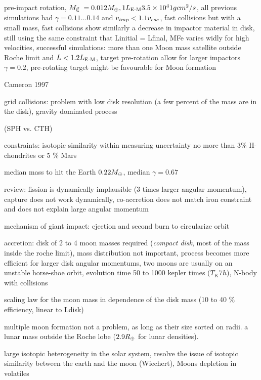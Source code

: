 \citep{Canup:2008p3551}
pre-impact rotation, $\ML = 0.012 \ME, 1 \lem 3.5 \times 10^41 g cm^2 / s$, all previous simulations had $\gamma = 0.11 \dots 0.14$ and $v_{imp} < 1.1 v_{esc}$, fast collisions but with a small mass, fast collisions show similarly a decrease in impactor material in disk, still using the same constraint that Linitial = Lfinal, MFe varies widly for high velocities, successful simulations: more than one Moon mass satellite outside Roche limit and $L < 1.2 L_{\textrm{E-M}}$, target pre-rotation allow for larger impactors $\gamma = 0.2$, pre-rotating target might be favourable for Moon formation

\cite{1997Icar..126..126C} Cameron 1997

grid collisions:
\cite{Wada:2006p1013}
problem with low disk resolution (a few percent of the mass are in the disk), gravity dominated process

\citep{Canup:2010p3713} (SPH vs. CTH)

constraints:
\cite{Wiechert:2001p3543}
isotopic similarity within measuring uncertainty
no more than 3\% H-chondrites or 5 \% Mars

\cite{Chambers:2001p2105}
median mass to hit the Earth $0.22 M_{\oplus}$, median $\gamma = 0.67$

\cite{Stevenson:1987p3540}
review: fission is dynamically implausible (3 times larger angular momentum), capture does not work dynamically, co-accretion does not match iron constraint and does not explain large angular momentum

mechanism of giant impact: ejection and second burn to circularize orbit

accretion:
\citep{Kokubo:2000p2195}
disk of 2 to 4 moon masses required (\emph{compact disk}, most of the mass inside the roche limit), mass distribution not important, process becomes more efficient for larger disk angular momentums, two moons are usually on an unstable horse-shoe orbit, evolution time 50 to 1000 kepler times ($T_K 7h$), N-body with collisions

\citep{Ida:1997p3395} scaling law for the moon mass in dependence of the disk mass (10 to 40 \% efficiency, linear to Ldisk)

\cite{Canup:1996p3541} multiple moon formation not a problem, as long as their size sorted on radii. a lunar mass outside the Roche lobe ($2.9 R_{\oplus}$ for lunar densities).

\citep{Pahlevan:2007p2065}
large isotopic heterogeneity in the solar system, resolve the issue of isotopic similarity between the earth and the moon (Wiechert), Moons depletion in volatiles


